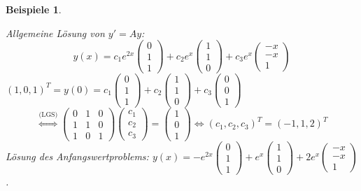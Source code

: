 \documentclass[12pt]{extreport} %
\theoremstyle{named}
\theoremstyle{nnamed}
\theoremstyle{itshape}
\theoremstyle{normal}
\newtheorem*{beispiele}{Beispiele}
\begin{document}
\begin{beispiele}
\begin{enumerate}
			Allgemeine Lösung von $y' = Ay$:
			$$ y(x) = c_{1} e^{2x} \begin{pmatrix} 0 \\ 1 \\ 1 \end{pmatrix} + c_{2} e^{x} \begin{pmatrix} 1 \\ 1 \\ 0 \end{pmatrix} + c_{3} e^{x} \begin{pmatrix} -x \\ -x \\ 1 \end{pmatrix} $$
			$(1,0,1)^{T} = y(0) = c_{1} \begin{pmatrix} 0 \\ 1 \\ 1 \end{pmatrix} + c_{2} \begin{pmatrix} 1 \\ 1 \\ 0 \end{pmatrix} + c_{3} \begin{pmatrix} 0 \\ 0 \\ 1 \end{pmatrix}$
			$$ \overset{\text{(LGS)}}{\iff} \begin{pmatrix} 0 & 1 & 0 \\ 1 & 1 & 0 \\ 1 & 0 & 1 \end{pmatrix} \begin{pmatrix} c_{1} \\ c_{2} \\ c_{3} \end{pmatrix} = \begin{pmatrix} 1 \\ 0 \\ 1 \end{pmatrix} \iff \left( c_{1}, c_{2}, c_{3} \right)^{T} = (-1, 1, 2)^{T} $$
			Lösung des Anfangswertproblems: $y(x) = -e^{2x} \begin{pmatrix} 0 \\ 1 \\ 1 \end{pmatrix} + e^{x} \begin{pmatrix} 1 \\ 1 \\ 0 \end{pmatrix} + 2 e^{x} \begin{pmatrix} -x \\ -x \\ 1 \end{pmatrix}$.
	\end{enumerate} 
\end{beispiele}
\end{document}
